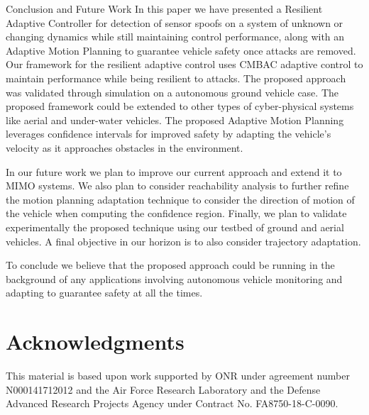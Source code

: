 
\begin{section}{Conclusion and Future Work} \label{sec:conclusion}
In this paper we have presented a Resilient Adaptive Controller for detection of sensor spoofs on a system of unknown or changing dynamics while still maintaining control performance, along with an Adaptive Motion Planning to guarantee vehicle safety once attacks are removed. Our framework for the resilient adaptive control uses CMBAC adaptive control to maintain performance while being resilient to attacks. The proposed approach was validated through simulation on a autonomous ground vehicle case. The proposed framework could be extended to other types of cyber-physical systems like aerial and under-water vehicles. The proposed Adaptive Motion Planning leverages confidence intervals for improved safety by adapting the vehicle's velocity as it approaches obstacles in the environment.

In our future work we plan to improve our current approach and extend it to MIMO systems. We also plan to consider reachability analysis to further refine the motion planning adaptation technique to consider the direction of motion of the vehicle when computing the confidence region. Finally, we plan to validate experimentally the proposed technique using our testbed of ground and aerial vehicles. A final objective in our horizon is to also consider trajectory adaptation.

To conclude we believe that the proposed approach could be running in the background of any applications involving autonomous vehicle monitoring and adapting to guarantee safety at all the times.


\end{section}

\section*{Acknowledgments} 
This material is based upon work supported by ONR under agreement number N000141712012 and 
the Air Force Research Laboratory and the Defense Advanced Research Projects Agency under Contract No. FA8750-18-C-0090. 


